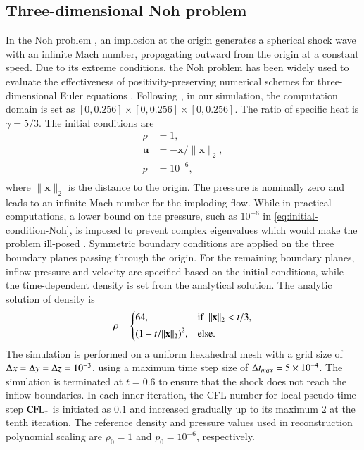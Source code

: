 \subsection{Three-dimensional Noh problem}

In the Noh problem \cite{noh1987errors}, an implosion at the origin generates a spherical shock wave with an infinite Mach number, propagating outward from the origin at a constant speed. 
Due to its extreme conditions, the Noh problem has been widely used to evaluate the effectiveness of positivity-preserving numerical schemes for three-dimensional Euler equations \cite{hu2013positivity}.
Following \cite{johnsen2010assessment}, 
in our simulation, the computation domain is set as
$[0,0.256]\times[0,0.256]\times[0,0.256]$. The ratio of specific heat is $\gamma=5/3$.
The initial conditions are
\begin{equation}
\label{eq:initial-condition-Noh}
    \begin{aligned}
        \rho & = 1, \\
        \mathbf{u}  &= -\mathbf{x} /\|\mathbf{x}\|_2, \\
        p & = 10^{-6},\\
    \end{aligned}
\end{equation}
where $\|\mathbf{x}\|_2$ is the distance to the 
origin. The pressure is nominally zero and leads to an infinite Mach number for the imploding flow. While in practical computations, a lower bound on the pressure, such as $10^{-6}$ in \eqref{eq:initial-condition-Noh}, is imposed to prevent complex eigenvalues which would make the problem ill-posed \cite{johnsen2010assessment}.
Symmetric boundary conditions are applied on the three boundary planes passing through the origin. For the remaining boundary planes, inflow pressure and velocity are specified based on the initial conditions, while the time-dependent density is set from the analytical solution.
The analytic solution of density \cite{noh1987errors} is 
\begin{equation}
    \rho = 
    \begin{dcases}
        64, & \text{if } \ \|\mathbf{x}\|_2<t/3, \\
        (1+t/\|\mathbf{x}\|_2)^2,  & \text{else}.
    \end{dcases}
\end{equation}
The simulation is performed on a uniform hexahedral mesh with a grid size of $\mathrm\Delta x = \mathrm\Delta y= \mathrm\Delta z = 10^{-3}$, using a maximum time step size of $\mathrm\Delta t_{max}=5 \times 10^{-4}$. The simulation is terminated at $t=0.6$ to ensure that the 
shock does not reach the inflow boundaries. 
In each inner iteration, the CFL number for local pseudo time step $\text{CFL}_\tau$ is initiated as $0.1$
and increased gradually up to its maximum $2$ at the tenth iteration.
The reference density and pressure values used in reconstruction polynomial scaling are $\rho_0=1$ and $p_0=10^{-6}$, respectively. 

